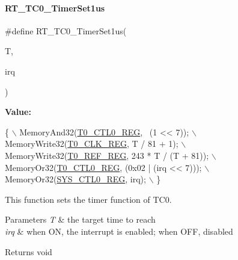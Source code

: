 \paragraph{\texorpdfstring{R\+T\+\_\+\+T\+C0\+\_\+\+Timer\+Set1us}{RT\_TC0\_TimerSet1us}}
{\footnotesize\ttfamily \#define R\+T\+\_\+\+T\+C0\+\_\+\+Timer\+Set1us(\begin{DoxyParamCaption}\item[{}]{T,  }\item[{}]{irq }\end{DoxyParamCaption})}

{\bfseries Value\+:}
\begin{DoxyCode}
\{                                                  \(\backslash\)
        MemoryAnd32(\mbox{\hyperlink{a00020_adadaa0ab1ebbd7ba9b70dfd24c3ed44da869abf9d87f78f45a0e07ad352abb39e}{T0\_CTL0\_REG}}, ~(1 << 7));           \(\backslash\)
        MemoryWrite32(\mbox{\hyperlink{a00020_adadaa0ab1ebbd7ba9b70dfd24c3ed44da944380f6d792e04a4c2e84dc668581a3}{T0\_CLK\_REG}}, T / 81 + 1);         \(\backslash\)
        MemoryWrite32(\mbox{\hyperlink{a00020_adadaa0ab1ebbd7ba9b70dfd24c3ed44da7b512fe986ef45d3f84daa6bf6733200}{T0\_REF\_REG}}, 243 * T / (T + 81)); \(\backslash\)
        MemoryOr32(\mbox{\hyperlink{a00020_adadaa0ab1ebbd7ba9b70dfd24c3ed44da869abf9d87f78f45a0e07ad352abb39e}{T0\_CTL0\_REG}}, (0x02 | (irq << 7)));  \(\backslash\)
        MemoryOr32(\mbox{\hyperlink{a00020_adadaa0ab1ebbd7ba9b70dfd24c3ed44dab61d9968d782d6c00e9de838e38913f5}{SYS\_CTL0\_REG}}, irq);                 \(\backslash\)
    \}
\end{DoxyCode}


This function sets the timer function of T\+C0. 


\begin{DoxyParams}{Parameters}
{\em T} & the target time to reach \\
\hline
{\em irq} & when ON, the interrupt is enabled; when O\+FF, disabled \\
\hline
\end{DoxyParams}
\begin{DoxyReturn}{Returns}
void 
\end{DoxyReturn}
